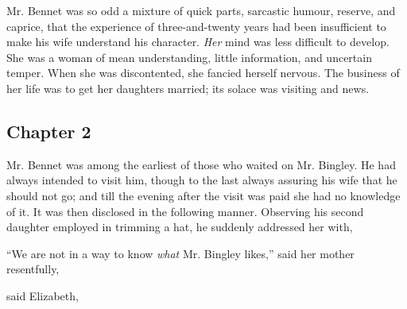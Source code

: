 




Mr. Bennet was so odd a mixture of quick parts, sarcastic humour, reserve, and caprice, that the experience of three-and-twenty years had been insufficient to make his wife understand his character. {\em Her} mind was less difficult to develop. She was a woman of mean understanding, little information, and uncertain temper. When she was discontented, she fancied herself nervous. The business of her life was to get her daughters married; its solace was visiting and news.

\subsection[chapter-2]{\useURL[url2][][][]\from[url2] Chapter 2}

Mr. Bennet was among the earliest of those who waited on Mr. Bingley. He had always intended to visit him, though to the last always assuring his wife that he should not go; and till the evening after the visit was paid she had no knowledge of it. It was then disclosed in the following manner. Observing his second daughter employed in trimming a hat, he suddenly addressed her with,


“We are not in a way to know {\em what} Mr. Bingley likes,” said her mother resentfully, 

 said Elizabeth, 


